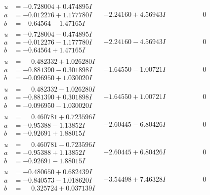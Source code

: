\documentclass[1p]{elsarticle_modified}
\theoremstyle{definition}
\begin{document}
$$\begin{array}{c|c|c}
\begin{aligned}
u &= -0.728004 + 0.474895 I \\
a &= -0.012276 + 1.177780 I \\
b &= -0.64564 - 1.47165 I\end{aligned}
 & -2.24160 + 4.56943 I & \phantom{-0.000000 } 0 \\ \hline\begin{aligned}
u &= -0.728004 - 0.474895 I \\
a &= -0.012276 - 1.177780 I \\
b &= -0.64564 + 1.47165 I\end{aligned}
 & -2.24160 - 4.56943 I & \phantom{-0.000000 } 0 \\ \hline\begin{aligned}
u &= \phantom{-}0.482332 + 1.026280 I \\
a &= -0.881390 - 0.301898 I \\
b &= -0.096950 + 1.030020 I\end{aligned}
 & -1.64550 - 1.00721 I & \phantom{-0.000000 } 0 \\ \hline\begin{aligned}
u &= \phantom{-}0.482332 - 1.026280 I \\
a &= -0.881390 + 0.301898 I \\
b &= -0.096950 - 1.030020 I\end{aligned}
 & -1.64550 + 1.00721 I & \phantom{-0.000000 } 0 \\ \hline\begin{aligned}
u &= \phantom{-}0.460781 + 0.723596 I \\
a &= -0.95388 - 1.13852 I \\
b &= -0.92691 + 1.88015 I\end{aligned}
 & -2.60445 - 6.80426 I & \phantom{-0.000000 } 0 \\ \hline\begin{aligned}
u &= \phantom{-}0.460781 - 0.723596 I \\
a &= -0.95388 + 1.13852 I \\
b &= -0.92691 - 1.88015 I\end{aligned}
 & -2.60445 + 6.80426 I & \phantom{-0.000000 } 0 \\ \hline\begin{aligned}
u &= -0.480650 + 0.682439 I \\
a &= -0.840573 - 1.018620 I \\
b &= \phantom{-}0.325724 + 0.037139 I\end{aligned}
 & -3.54498 + 7.46328 I & \phantom{-0.000000 } 0 \\ \hline\begin{aligned}

\end{aligned}
\end{array}$$
\end{document}
